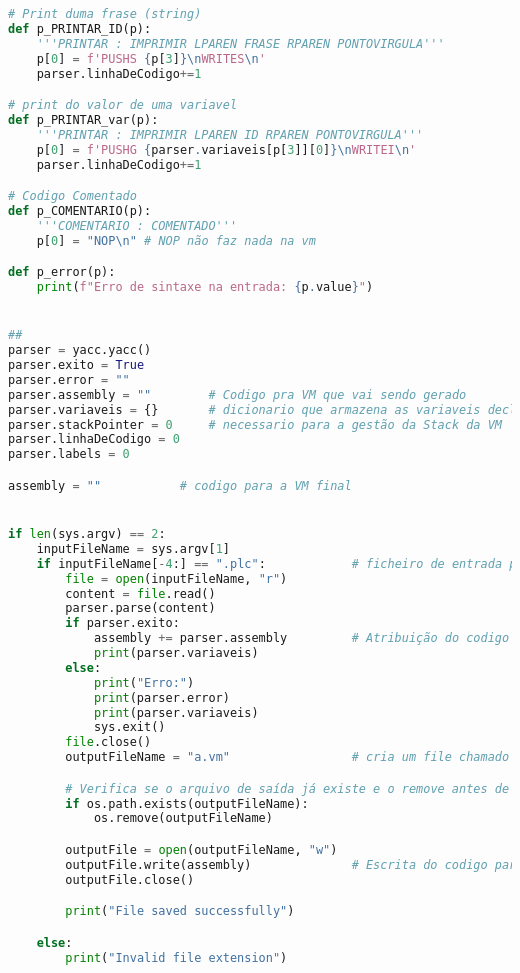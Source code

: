 \documentclass[11pt,a4paper]{report}
\begin{document}
\begin{scriptsize}
\begin{lstlisting}[language=python]
# Print duma frase (string)
def p_PRINTAR_ID(p):
    '''PRINTAR : IMPRIMIR LPAREN FRASE RPAREN PONTOVIRGULA'''
    p[0] = f'PUSHS {p[3]}\nWRITES\n'
    parser.linhaDeCodigo+=1

# print do valor de uma variavel
def p_PRINTAR_var(p):
    '''PRINTAR : IMPRIMIR LPAREN ID RPAREN PONTOVIRGULA'''
    p[0] = f'PUSHG {parser.variaveis[p[3]][0]}\nWRITEI\n'
    parser.linhaDeCodigo+=1

# Codigo Comentado
def p_COMENTARIO(p):
    '''COMENTARIO : COMENTADO'''
    p[0] = "NOP\n" # NOP não faz nada na vm

def p_error(p):
    print(f"Erro de sintaxe na entrada: {p.value}")


##
parser = yacc.yacc()
parser.exito = True
parser.error = ""
parser.assembly = ""        # Codigo pra VM que vai sendo gerado
parser.variaveis = {}       # dicionario que armazena as variaveis declaradas
parser.stackPointer = 0     # necessario para a gestão da Stack da VM
parser.linhaDeCodigo = 0
parser.labels = 0

assembly = ""           # codigo para a VM final


if len(sys.argv) == 2:
    inputFileName = sys.argv[1]
    if inputFileName[-4:] == ".plc":            # ficheiro de entrada precisa da extensão ".plc"
        file = open(inputFileName, "r")
        content = file.read()
        parser.parse(content)
        if parser.exito:
            assembly += parser.assembly         # Atribuição do codigo para a VM
            print(parser.variaveis)
        else:
            print("Erro:")
            print(parser.error)
            print(parser.variaveis)
            sys.exit()
        file.close()
        outputFileName = "a.vm"                 # cria um file chamado "a.vm" para rodar na VM

        # Verifica se o arquivo de saída já existe e o remove antes de criar um novo
        if os.path.exists(outputFileName):
            os.remove(outputFileName)

        outputFile = open(outputFileName, "w")
        outputFile.write(assembly)              # Escrita do codigo para a VM Final
        outputFile.close()

        print("File saved successfully")

    else:
        print("Invalid file extension")

\end{lstlisting}
\end{scriptsize}
\end{document}
